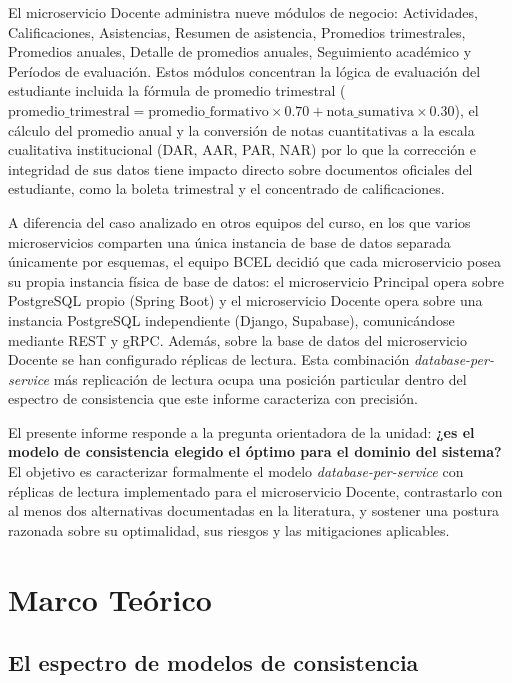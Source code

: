 \documentclass[11pt,a4paper]{article}
\begin{document}
El microservicio Docente administra nueve módulos de negocio: Actividades, Calificaciones, Asistencias, Resumen de asistencia, Promedios trimestrales, Promedios anuales, Detalle de promedios anuales, Seguimiento académico y Períodos de evaluación. Estos módulos concentran la lógica de evaluación del estudiante incluida la fórmula de promedio trimestral
(\(\text{promedio\_trimestral} = \text{promedio\_formativo} \times 0.70 + \text{nota\_sumativa}
\times 0.30\)), el cálculo del promedio anual y la conversión de notas cuantitativas a la escala cualitativa institucional (DAR, AAR, PAR, NAR) por lo que la corrección e integridad de sus datos tiene impacto directo sobre documentos oficiales del estudiante, como la boleta trimestral y el concentrado de calificaciones.

A diferencia del caso analizado en otros equipos del curso, en los que varios microservicios
comparten una única instancia de base de datos separada únicamente por esquemas, el equipo BCEL decidió que cada microservicio posea su propia instancia física de base de datos: el microservicio Principal opera sobre PostgreSQL propio (Spring Boot) y el microservicio
Docente opera sobre una instancia PostgreSQL independiente (Django, Supabase), comunicándose
mediante REST y gRPC. Además, sobre la base de datos del microservicio Docente se han configurado réplicas de lectura. Esta combinación \emph{database-per-service} más replicación de lectura ocupa una posición particular dentro del espectro de consistencia que este informe caracteriza con precisión.

El presente informe responde a la pregunta orientadora de la unidad: \textbf{¿es el modelo de consistencia elegido el óptimo para el dominio del sistema?} El objetivo es caracterizar formalmente el modelo \emph{database-per-service} con réplicas de lectura implementado para el microservicio Docente, contrastarlo con al menos dos alternativas documentadas en la literatura, y sostener una postura razonada sobre su optimalidad, sus riesgos y las mitigaciones aplicables.

\section{Marco Teórico}

\subsection{El espectro de modelos de consistencia}
\end{document}

